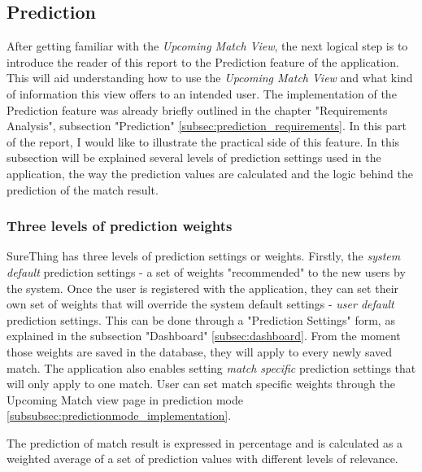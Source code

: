 \subsection{Prediction}
\label{subsec:prediction_implementation}
After getting familiar with the \emph{Upcoming Match View}, the next logical step is to introduce the reader of this report to the Prediction feature of the application. This will aid understanding how to use the \emph{Upcoming Match View} and what kind of information this view offers to an intended user. The implementation of the Prediction feature was already briefly outlined in the chapter "Requirements Analysis", subsection "Prediction" \ref{subsec:prediction_requirements}. In this part of the report, I would like to illustrate the practical side of this feature. In this subsection will be explained several levels of prediction settings used in the application, the way the prediction values are calculated and the logic behind the prediction of the match result. 

\subsubsection*{Three levels of prediction weights}
SureThing has three levels of prediction settings or weights. Firstly, the \emph{system default} prediction settings - a set of weights "recommended" to the new users by the system. Once the user is registered with the application, they can set their own set of weights that will override the system default settings - \emph{user default} prediction settings. This can be done through a "Prediction Settings" form, as explained in the subsection "Dashboard" \ref{subsec:dashboard}. From the moment those weights are saved in the database, they will apply to every newly saved match. The application also enables setting \emph {match specific} prediction settings that will only apply to one match. User can set match specific weights through the Upcoming Match view page in prediction mode \ref{subsubsec:predictionmode_implementation}.

The prediction of match result is expressed in percentage and is calculated as a weighted average of a set of prediction values with different levels of relevance. 

